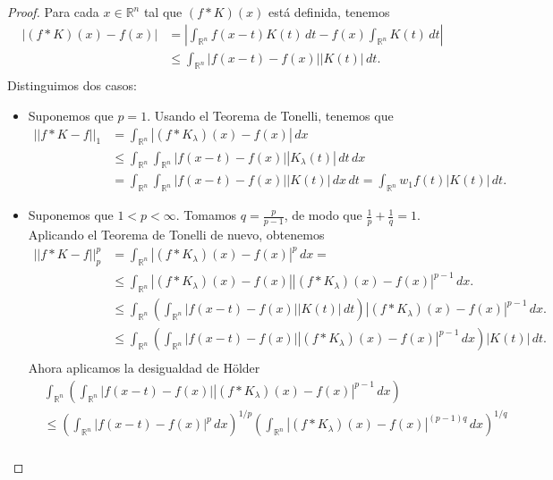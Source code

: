 \begin{proof}
\noindent Para cada  $x \in \mathbb{R}^n$ tal que $(f*K)(x)$ está definida, tenemos 
 \begin{align}
    |(f*K)(x)-f(x)| &= \left|\int_{\mathbb{R}^n}f(x-t)K(t) \, dt - f(x) \int_{\mathbb{R}^n}K(t) \,dt \right| \\
    &\leq \int_{\mathbb{R}^n} \left|f(x-t)-f(x) \right| |K(t)| \, dt. \\ 
\end{align}
\noindent Distinguimos dos casos:
\begin{itemize}
    \item Suponemos que $p=1$. Usando el Teorema de Tonelli, tenemos que
    \begin{align*}
        ||f*K-f||_1 &= \int_{\mathbb{R}^n} |(f*K_{\lambda})(x)-f(x)| \, dx\\
        &\leq \int_{\mathbb{R}^n} \int_{\mathbb{R}^n} \left|f(x-t)-f(x) \right| |K_{\lambda}(t)| \, dt \, dx \\
        &= \int_{\mathbb{R}^n} \int_{\mathbb{R}^n} \left|f(x-t)-f(x) \right| |K(t)| \, dx \, dt  =\int_{\mathbb{R}^n} w_1f(t) |K(t)|\, dt.
    \end{align*}
    \item Suponemos que $1<p<\infty$. Tomamos $q = \frac{p}{p-1}$, de modo que $\frac{1}{p}+\frac{1}{q}=1$.
    Aplicando el Teorema de Tonelli de nuevo, obtenemos
    \begin{align}
    ||f*K-f||_p^p &= \int_{\mathbb{R}^n}|(f*K_{\lambda})(x)-f(x)|^p \, dx  =  \\
    &\leq \int_{\mathbb{R}^n} |(f*K_{\lambda})(x)-f(x)||(f*K_{\lambda})(x)-f(x)|^{p-1} \, dx. \\ 
    &\leq \int_{\mathbb{R}^n} \left(\int_{\mathbb{R}^n} \left|f(x-t)-f(x) \right| |K(t)| \, dt \right)|(f*K_{\lambda})(x)-f(x)|^{p-1} \, dx. \\ 
    &\leq \int_{\mathbb{R}^n} \left(\int_{\mathbb{R}^n} \left|f(x-t)-f(x) \right| |(f*K_{\lambda})(x)-f(x)|^{p-1} \,dx \right) |K(t)|\, dt. \\ 
\end{align}
    Ahora aplicamos la desigualdad de H\"{o}lder 
    \begin{align}
    &\int_{\mathbb{R}^n} \left(\int_{\mathbb{R}^n} \left|f(x-t)-f(x) \right| |(f*K_{\lambda})(x)-f(x)|^{p-1} \,dx \right) \\
    &\leq \left( \int_{\mathbb{R}^n} \left|f(x-t)-f(x) \right|^p \, dx  \right)^{1/p} \left( \int_{\mathbb{R}^n} |(f*K_{\lambda})(x)-f(x)|^{(p-1)q} \, dx  \right)^{1/q} \\

\end{align}
\end{itemize}
\end{proof}
